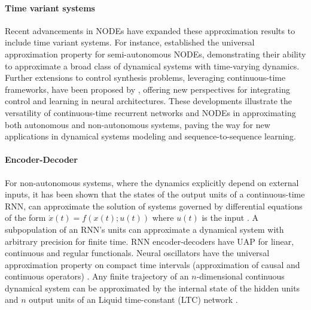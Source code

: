 \documentclass{article}
\theoremstyle{definition} \newtheorem{definition}{Definition}
\theoremstyle{remark} \newtheorem{remark}{Remark}
\newcounter{ct}
\begin{document}
\paragraph{Time variant systems}
Recent advancements in NODEs have expanded these approximation results to include time variant systems. For instance, \citet{li2024universal} established the universal approximation property for semi-autonomous NODEs, demonstrating their ability to approximate a broad class of dynamical systems with time-varying dynamics. Further extensions to control synthesis problems, leveraging continuous-time frameworks, have been proposed by \citet{mei2024controlsynth}, offering new perspectives for integrating control and learning in neural architectures.
%
These developments illustrate the versatility of continuous-time recurrent networks and NODEs in approximating both autonomous and non-autonomous systems, paving the way for new applications in dynamical systems modeling and sequence-to-sequence learning.


\paragraph{Encoder-Decoder}
For non-autonomous systems, where the dynamics explicitly depend on external inputs, it has been shown that the states of the output units of a continuous-time RNN, can approximate the solution of systems governed by differential equations of the form $\dot{x}(t) = f(x(t); u(t))$ where $u(t)$ is the input \citep{garces2012strategies}. %
A subpopulation of an RNN's units can approximate a dynamical system with arbitrary precision for finite time\citep{kambhampati2000approximation}. %
RNN encoder-decoders have UAP for linear, continuous and regular functionals\citep{li2021approximationencdec}.
Neural oscillators have the universal approximation property on compact time intervals (approximation of causal and continuous operators) \citep{lanthaler2023neuraloscillators}.
%
Any finite trajectory of an $n$-dimensional continuous dynamical system can be approximated by the internal state of the hidden units and $n$ output units of an Liquid time-constant (LTC) network \citep{hasani2018liquid}.
\end{document}
